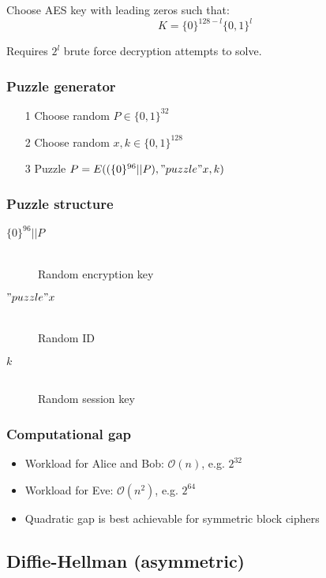 \documentclass[a4paper]{article}
\begin{document}
Choose AES key with leading zeros such that:
\[K = \{0\}^{128-l} \{0,1\}^{l}\]

Requires $2^{l}$ brute force decryption attempts to solve.

\subsubsection{Puzzle generator}

\begin{enumerate}
  \item[1] Choose random $P \in \{0,1\}^{32}$
  \item[2] Choose random $x, k \in \{0,1\}^{128}$
  \item[3] Puzzle $P = E((\{0\}^{96}||P), "puzzle" x, k)$
\end{enumerate}

\subsubsection{Puzzle structure}

\begin{description}
  \item[$\{0\}^{96} || P$] \hfill \\
    Random encryption key
  \item[$"puzzle" x$] \hfill \\
    Random ID
  \item[$k$] \hfill \\
    Random session key
\end{description}

\subsubsection{Computational gap}

\begin{itemize}
  \item Workload for Alice and Bob: $\mathcal{O}(n)$, e.g. $2^{32}$
  \item Workload for Eve: $\mathcal{O}(n^{2})$, e.g. $2^{64}$
  \item Quadratic gap is best achievable for symmetric block ciphers
\end{itemize}

\subsection{Diffie-Hellman (asymmetric)}
\end{document}
